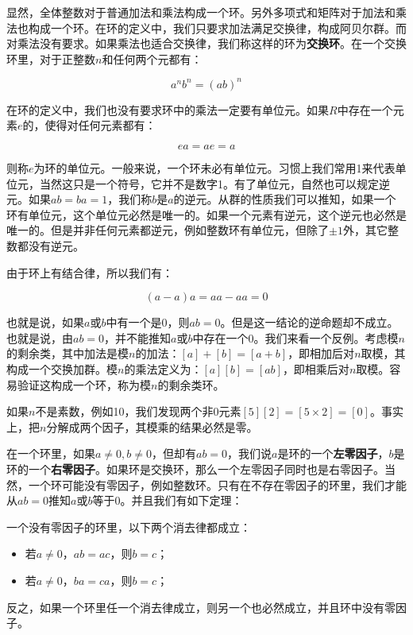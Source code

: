\documentclass{article}
\begin{document}
显然，全体整数对于普通加法和乘法构成一个环。另外多项式和矩阵对于加法和乘法也构成一个环。在环的定义中，我们只要求加法满足交换律，构成阿贝尔群。而对乘法没有要求。如果乘法也适合交换律，我们称这样的环为\textbf{交换环}。在一个交换环里，对于正整数$n$和任何两个元都有：

\[
a^nb^n = (ab)^n
\]

在环的定义中，我们也没有要求环中的乘法一定要有单位元。如果$R$中存在一个元素$e$的，使得对任何元素都有：

\[
ea = ae = a
\]

则称$e$为环的单位元。一般来说，一个环未必有单位元。习惯上我们常用1来代表单位元，当然这只是一个符号，它并不是数字1。有了单位元，自然也可以规定逆元。如果$ab = ba = 1$，我们称$b$是$a$的逆元。从群的性质我们可以推知，如果一个环有单位元，这个单位元必然是唯一的。如果一个元素有逆元，这个逆元也必然是唯一的。但是并非任何元素都逆元，例如整数环有单位元，但除了$\pm 1$外，其它整数都没有逆元。

由于环上有结合律，所以我们有：

\[
(a - a)a = aa - aa = 0
\]

也就是说，如果$a$或$b$中有一个是0，则$ab = 0$。但是这一结论的逆命题却不成立。也就是说，由$ab = 0$，并不能推知$a$或$b$中存在一个0。我们来看一个反例。考虑模$n$的剩余类，其中加法是模$n$的加法：$[a] + [b] = [a + b]$，即相加后对$n$取模，其构成一个交换加群。模$n$的乘法定义为：$[a][b] = [ab]$，即相乘后对$n$取模。容易验证这构成一个环，称为模$n$的剩余类环。

如果$n$不是素数，例如10，我们发现两个非0元素$[5][2] = [5 \times 2] = [0]$。事实上，把$n$分解成两个因子，其模乘的结果必然是零。

在一个环里，如果$a \neq 0, b \neq 0$，但却有$ab = 0$，我们说$a$是环的一个\textbf{左零因子}，$b$是环的一个\textbf{右零因子}。如果环是交换环，那么一个左零因子同时也是右零因子。当然，一个环可能没有零因子，例如整数环。只有在不存在零因子的环里，我们才能从$ab = 0$推知$a$或$b$等于0。并且我们有如下定理：

\begin{theorem}
一个没有零因子的环里，以下两个消去律都成立：
\begin{itemize}
\item 若$a \neq 0$，$ab = ac$，则$b = c$；
\item 若$a \neq 0$，$ba = ca$，则$b = c$；
\end{itemize}
\end{theorem}

反之，如果一个环里任一个消去律成立，则另一个也必然成立，并且环中没有零因子。
\end{document}
